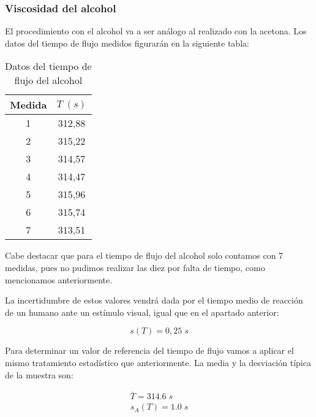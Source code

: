 \documentclass[a4paper,12pt,titlepage]{article}
\begin{document}
\newpage

\subsubsection{Viscosidad del alcohol}

El procedimiento con el alcohol va a ser análogo al realizado con la acetona. Los datos del tiempo de flujo medidos figurarán en la siguiente tabla:

\begin{table}[h!]
    \centering
    \begin{tabular}{|c|c|}
    \hline
    Medida  & $T \;(s)$ \\ \hline
    1 & 312,88 \\ \hline
    2 & 315,22 \\ \hline
    3 & 314,57 \\ \hline
    4 & 314,47 \\ \hline
    5 & 315,96 \\ \hline
    6 & 315,74 \\ \hline
    7 & 313,51 \\ \hline
    \end{tabular}
    \caption{Datos del tiempo de flujo del alcohol}
    \label{T alcohol}
    \end{table}

Cabe destacar que para el tiempo de flujo del alcohol solo contamos con 7 medidas, pues no pudimos realizar las diez por falta de tiempo, como mencionamos anteriormente.

\par La incertidumbre de estos valores vendrá dada por el tiempo medio de reacción de un humano ante un estímulo visual, igual que en el apartado anterior:

\begin{equation}
    s(T) = 0,25 \; s
\end{equation}    

Para determinar un valor de referencia del tiempo de flujo vamos a aplicar el mismo tratamiento estadístico que anteriormente. La media y la desviación típica de la muestra son:

\begin{equation}
    \begin{gathered}
        \overline{T} = 314.6\; s\\
        s_A(T) =  1.0 \; s
    \end{gathered}
\end{equation}
\end{document}
